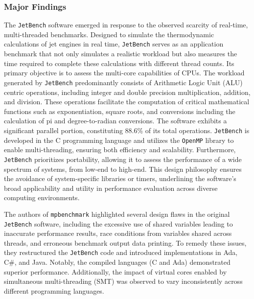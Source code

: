 \subsubsection{Major Findings}

The \texttt{JetBench} software emerged in response to the observed scarcity of real-time, multi-threaded benchmarks. Designed to simulate the thermodynamic calculations of jet engines in real time, \texttt{JetBench} serves as an application benchmark that not only simulates a realistic workload but also measures the time required to complete these calculations with different thread counts. Its primary objective is to assess the multi-core capabilities of CPUs. The workload generated by \texttt{JetBench} predominantly consists of Arithmetic Logic Unit (ALU) centric operations, including integer and double precision multiplication, addition, and division. These operations facilitate the computation of critical mathematical functions such as exponentiation, square roots, and conversions including the calculation of pi and degree-to-radian conversions. The software exhibits a significant parallel portion, constituting 88.6\% of its total operations. \texttt{JetBench} is developed in the C programming language and utilizes the \texttt{OpenMP} library to enable multi-threading, ensuring both efficiency and scalability. Furthermore, \texttt{JetBench} prioritizes portability, allowing it to assess the performance of a wide spectrum of systems, from low-end to high-end. This design philosophy ensures the avoidance of system-specific libraries or timers, underlining the software’s broad applicability and utility in performance evaluation across diverse computing environments.

The authors of \texttt{mpbenchmark}\cite{mpbenchmark_paper} highlighted several design flaws in the original \texttt{JetBench} software\cite{JetBench_paper}, including the excessive use of shared variables leading to inaccurate performance results, race conditions from variables shared across threads, and erroneous benchmark output data printing. To remedy these issues, they restructured the \texttt{JetBench} code and introduced implementations in Ada, C\#, and Java. Notably, the compiled languages (C and Ada) demonstrated superior performance. Additionally, the impact of virtual cores enabled by simultaneous multi-threading (SMT) was observed to vary inconsistently across different programming languages.

